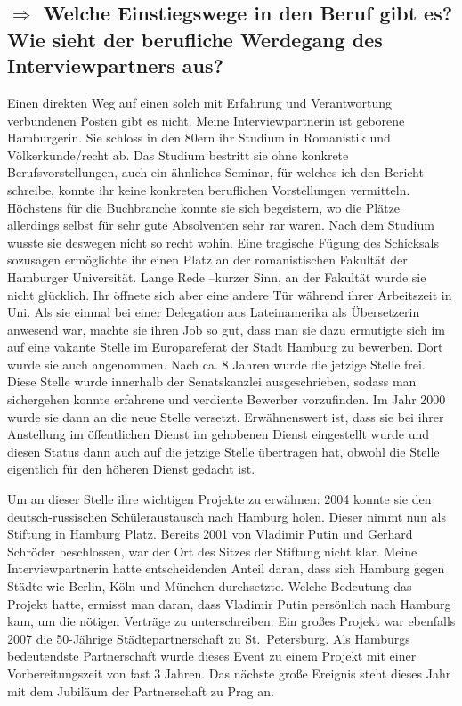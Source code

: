 \documentclass[12pt,headsepline,a4paper]{scrartcl}
\newcommand\quest[1]{\subsection*{$\Rightarrow$ #1}}
\begin{document}
\quest{Welche Einstiegswege in den Beruf gibt es? Wie sieht der berufliche Werdegang des Interviewpartners aus?}
Einen direkten Weg auf einen solch mit Erfahrung und Verantwortung verbundenen Posten gibt es nicht.
Meine Interviewpartnerin ist geborene Hamburgerin. Sie schloss in den 80ern ihr Studium in Romanistik und Völkerkunde/recht ab. Das Studium bestritt sie ohne konkrete Berufsvorstellungen, auch ein ähnliches Seminar, für welches ich den Bericht schreibe, konnte ihr keine konkreten beruflichen Vorstellungen vermitteln. Höchstens für die Buchbranche konnte sie sich begeistern, wo die Plätze allerdings selbst für sehr gute Absolventen sehr rar waren. Nach dem Studium wusste sie deswegen nicht so recht wohin. Eine tragische Fügung des Schicksals sozusagen ermöglichte ihr einen Platz an der romanistischen Fakultät der Hamburger Universität. Lange Rede –kurzer Sinn, an der Fakultät wurde sie nicht glücklich. Ihr öffnete sich aber eine andere Tür während ihrer Arbeitszeit in Uni.
Als sie einmal bei einer Delegation aus Lateinamerika als Übersetzerin anwesend war, machte sie ihren Job so gut, dass man sie dazu ermutigte sich im auf eine vakante Stelle im Europareferat der Stadt Hamburg zu bewerben. Dort wurde sie auch angenommen.
Nach ca. 8 Jahren wurde die jetzige Stelle frei. Diese Stelle wurde innerhalb der Senatskanzlei ausgeschrieben, sodass man sichergehen konnte erfahrene und verdiente Bewerber vorzufinden.
Im Jahr 2000 wurde sie dann an die neue Stelle versetzt. Erwähnenswert ist, dass sie bei ihrer Anstellung im öffentlichen Dienst im gehobenen Dienst eingestellt wurde und diesen Status dann auch auf die jetzige Stelle übertragen hat, obwohl die Stelle eigentlich für den höheren Dienst gedacht ist.

Um an dieser Stelle ihre wichtigen Projekte zu erwähnen:
2004 konnte sie den deutsch-russischen Schüleraustausch nach Hamburg holen. Dieser nimmt nun als Stiftung in Hamburg Platz. Bereits 2001 von Vladimir Putin und Gerhard Schröder beschlossen, war der Ort des Sitzes der Stiftung nicht klar. Meine Interviewpartnerin hatte entscheidenden Anteil daran, dass sich Hamburg gegen Städte wie Berlin, Köln und München durchsetzte. Welche Bedeutung das Projekt hatte, ermisst man daran, dass Vladimir Putin persönlich nach Hamburg kam, um die nötigen Verträge zu unterschreiben.
Ein großes Projekt war ebenfalls 2007 die 50-Jährige Städtepartnerschaft zu  St.\ Petersburg. Als Hamburgs bedeutendste Partnerschaft wurde dieses Event zu einem Projekt mit einer Vorbereitungszeit von fast 3 Jahren.
Das nächste große Ereignis steht dieses Jahr mit dem Jubiläum der Partnerschaft zu Prag an.
\end{document}
